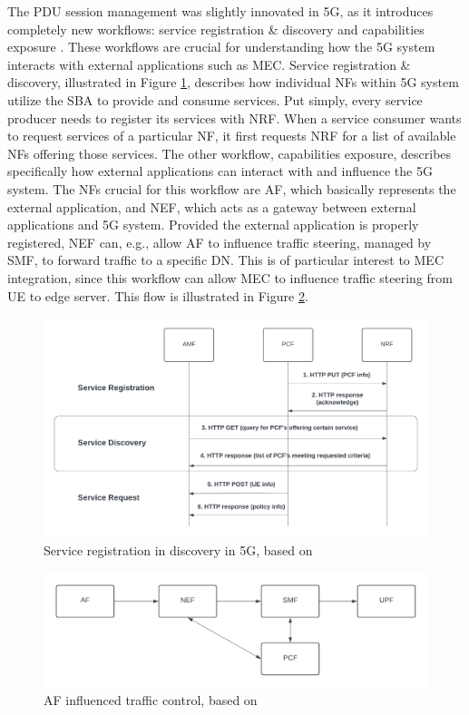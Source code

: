 \documentclass[12pt,a4paper,twoside]{report}
\begin{document}
The PDU session management was slightly innovated in 5G, as it introduces completely new workflows: service registration \& discovery and capabilities exposure \cite{rommer20195g}. These workflows are crucial for understanding how the 5G system interacts with external applications such as MEC. Service registration \& discovery, illustrated in Figure \ref{F:service-reg-disc}, describes how individual NFs within 5G system utilize the SBA to provide and consume services. Put simply, every service producer needs to register its services with NRF. When a service consumer wants to request services of a particular NF, it first requests NRF for a list of available NFs offering those services. The other workflow, capabilities exposure, describes specifically how external applications can interact with and influence the 5G system. The NFs crucial for this workflow are AF, which basically represents the external application, and NEF, which acts as a gateway between external applications and 5G system. Provided the external application is properly registered, NEF can, e.g., allow AF to influence traffic steering, managed by SMF, to forward traffic to a specific DN. This is of particular interest to MEC integration, since this workflow can allow MEC to influence traffic steering from UE to edge server. This flow is illustrated in Figure \ref{F:traffic-control}.

\begin{figure}[ht]
	\centering
	\includegraphics[width=\textwidth]{./images/5G-reg-disc.png}
	\caption{Service registration in discovery in 5G, based on \cite{rommer20195g}}
	\label{F:service-reg-disc}
\end{figure}

\begin{figure}[ht]
	\centering
	\includegraphics[width=15cm]{./images/traffic-control.png}
	\caption{AF influenced traffic control, based on \cite{rommer20195g}}
	\label{F:traffic-control}
\end{figure}
\end{document}
